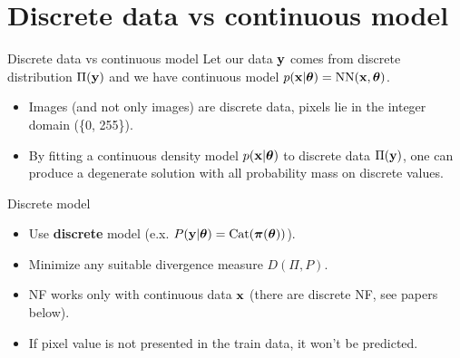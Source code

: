 \section{Discrete data vs continuous model}
\begin{frame}{Discrete data vs continuous model}
	Let our data $\mathbf{y}$ comes from discrete distribution $\Pi(\mathbf{y})$ and we have continuous model $p(\mathbf{x} | \boldsymbol{\theta}) = \text{NN}(\mathbf{x}, \boldsymbol{\theta})$.
	\begin{itemize}
		\item Images {\color{gray}(and not only images)} are discrete data, pixels lie in the integer domain (\{0, 255\}). 
		\item By fitting a continuous density model $p(\mathbf{x} | \boldsymbol{\theta})$ to discrete data $\Pi(\mathbf{y})$, one can produce a degenerate solution with all probability mass on discrete values. 
	\end{itemize}
	\begin{block}{Discrete model}
		\begin{itemize}
			\item Use \textbf{discrete} model (e.x. $P(\mathbf{y} | \boldsymbol{\theta}) = \text{Cat}(\boldsymbol{\pi}(\boldsymbol{\theta}))$). 
			\item Minimize any suitable divergence measure $D(\Pi, P)$.
			\item NF works only with continuous data $\mathbf{x}$ (there are discrete NF, see papers below).
			\item If pixel value is not presented in the train data, it won't be predicted.		
		\end{itemize}
	\end{block}
\end{frame}

